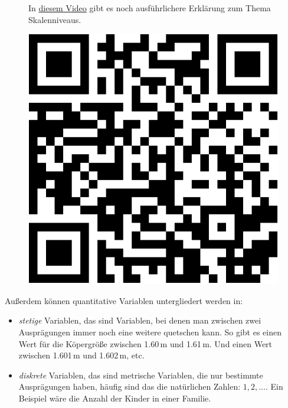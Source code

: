 \documentclass[
  letterpaper,
]{scrbook}
\providecommand{\tightlist}{%
  \setlength{\itemsep}{0pt}\setlength{\parskip}{0pt}}\usepackage{longtable,booktabs,array}
\theoremstyle{definition}
\theoremstyle{definition}
\theoremstyle{definition}
\theoremstyle{remark}
\begin{document}
\begin{figure}

\begin{minipage}{0.80\linewidth}
In \href{https://www.youtube.com/watch?v=_mN3kFe56ng}{diesem Video} gibt
es noch ausführlichere Erklärung zum Thema Skalenniveaus.\end{minipage}%
%
\begin{minipage}{0.20\linewidth}

\begin{center}
\includegraphics[width=0.75\linewidth,height=\textheight,keepaspectratio]{010-rahmen_files/figure-pdf/qr-youtube-skalenniveaus-1.pdf}
\end{center}

\end{minipage}%

\end{figure}%

Außerdem können quantitative Variablen untergliedert werden in:

\begin{itemize}
\tightlist
\item
  \emph{stetige} Variablen, das sind Variablen, bei denen man zwischen
  zwei Ausprägungen immer noch eine weitere quetschen kann. So gibt es
  einen Wert für die Köpergröße zwischen 1.60\,m und 1.61\,m. Und einen
  Wert zwischen 1.601\,m und 1.602\,m, etc.
\item
  \emph{diskrete} Variablen, das sind metrische Variablen, die nur
  bestimmte Ausprägungen haben, häufig sind das die natürlichen Zahlen:
  \(1,2,...\). Ein Beispiel wäre die Anzahl der Kinder in einer Familie.
\end{itemize}
\end{document}
